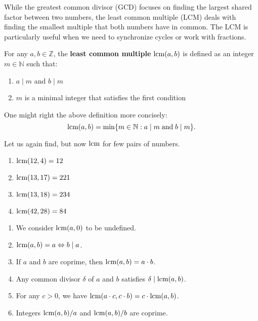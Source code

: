 \documentclass[../lecture-notes-148x210.tex]{subfiles}
\begin{document}
While the greatest common divisor (GCD) focuses on finding the largest shared factor between two numbers, the least common multiple (LCM) deals with finding the smallest multiple that both numbers have in common. The LCM is particularly useful when we need to synchronize cycles or work with fractions.

\begin{definition}[LCM]
    For any $a, b \in \mathbb{Z}$, the \textbf{least common multiple} $\text{lcm}(a,
    b)$ is defined as an integer $m \in \mathbb{N}$ such that:
    \begin{enumerate}
        \item $a \mid m$ and $b \mid m$
        \item $m$ is a minimal integer that satisfies the first condition 
    \end{enumerate}

    One might right the above definition more concisely:
    \begin{equation*}
        \text{lcm}(a,b) = \min\{m \in \mathbb{N}: a \mid m \; \text{and} \; b \mid m\}.
    \end{equation*}
\end{definition}

\begin{example}
    Let us again find, but now $\text{lcm}$ for few pairs of numbers.
    \hfill
    \begin{multicols}{2}
        \begin{enumerate}
            \item $\text{lcm}(12, 4) = 12$
            \item $\text{lcm}(13, 17) = 221$
            \item $\text{lcm}(13, 18) = 234$
            \item $\text{lcm}(42, 28) = 84$
        \end{enumerate}
    \end{multicols}
\end{example}

\begin{lemma} 
    \hfil
    \begin{enumerate}
        \item We consider $\text{lcm}(a, 0)$ to be undefined.
        \item $\text{lcm}(a, b) = a \Leftrightarrow b \mid a$.
        \item If $a$ and $b$ are coprime, then $\text{lcm}(a, b) = a \cdot b$.
        \item Any common divisor $\delta$ of $a$ and $b$ satisfies $\delta \mid \text{lcm}(a, b)$.
        \item For any $c > 0$, we have $\text{lcm}(a \cdot c, c \cdot b) =  c \cdot \text{lcm}(a, b)$.
        \item Integers $\text{lcm}(a, b)/a$ and $\text{lcm}(a, b) / b$ are coprime.
    \end{enumerate}
\end{lemma}
\end{document}
